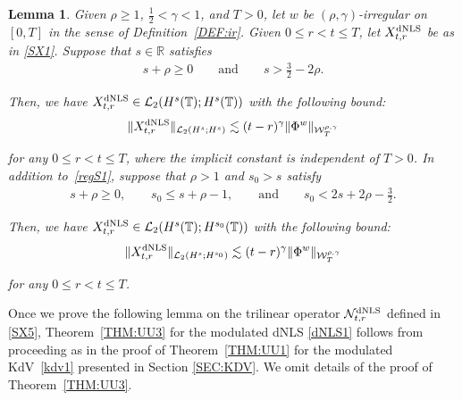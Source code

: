 \documentclass[letterpaper, 11pt,  reqno]{amsart}
\newtheorem{lemma}[theorem]{Lemma}
\newcommand{\1}{\hspace{0.5mm}\text{I}\hspace{0.5mm}}
\newcommand{\noi}{\noindent}
\newcommand{\R}{\mathbb{R}}
\newcommand{\T}{\mathbb{T}}
\renewcommand{\L}{\mathcal{L}}
\newcommand{\g}{\gamma}
\newcommand{\les}{\lesssim}
\newcommand{\NN}{\mathcal{N}}
\newcommand{\W}{\mathcal{W}}
\newcommand{\dNLS}{\text{\rm dNLS} }
\numberwithin{equation}{section}
\numberwithin{theorem}{section}
\begin{document}
\begin{lemma}\label{LEM:nonlin5}
Given $\rho \ge 1$,  $\frac12< \g < 1$, and $T> 0$, 
let  $w$ be $(\rho,\g)$-irregular on $[0, T]$ in the sense of Definition~\ref{DEF:ir}.
Given $0 \le r < t \le T$, let $X^\dNLS_{t, r}$
be as in \eqref{SX1}.
Suppose that $s \in \R$ satisfies 
\begin{align}
 s+ \rho \ge 0 \qquad\text{and}\qquad 
s >  \frac 32 - 2\rho.
\label{regS1}
\end{align}



\noi
Then, 
we have $X_{t, r}^\dNLS \in \L_2(H^s(\T); H^{s}(\T))$
with the following bound\textup{:}
\begin{align*}
 \|X^\dNLS_{t, r}\|_{\L_2(H^s; H^{s})}
\les 
(t- r)^\g  \|\Phi^w\|_{  \W^{\rho,\g}_T}
\end{align*}

\noi
for any $0 \le r < t \le T$, 
where the implicit constant is independent of $T > 0$.
In addition to~\eqref{regS1}, suppose that 
$\rho  > 1$ and $s_0 > s$ satisfy
\begin{align*}
s+ \rho \ge 0, \qquad s_0 \le s + \rho - 1, \qquad \text{and}\qquad 
s_0 < 2s + 2\rho - \frac 32.
\end{align*}




\noi
Then, 
we have 
$X^\dNLS_{t, r} \in \L_2(H^s(\T); H^{s_0}(\T))$
with the following bound\textup{:}
\begin{align*}
 \|X^\dNLS_{t, r}\|_{\L_2(H^s; H^{s_0})}
\les 
(t- r)^\g  \|\Phi^w\|_{  \W^{\rho,\g}_T}
\end{align*}

\noi
for any $0 \le r< t \le T$.



\end{lemma}



Once we prove the following lemma
on the trilinear operator $\NN_{t, r}^\dNLS$
defined in \eqref{SX5}, 
Theorem~\ref{THM:UU3} 
for the modulated dNLS \eqref{dNLS1} follows
from proceeding as in 
the proof of Theorem~\ref{THM:UU1}
for the modulated KdV~\eqref{kdv1}
presented in Section \ref{SEC:KDV}.
We omit details of the proof of 
Theorem~\ref{THM:UU3}.
\end{document}
